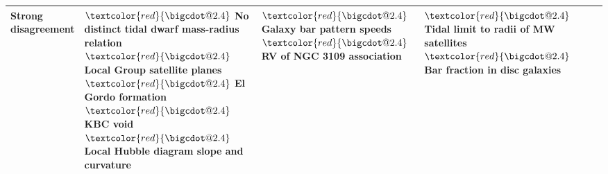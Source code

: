 \documentclass[fleqn,usenatbib,useAMS,onecolumn]{mnras} %
\makeatletter
\DeclareRobustCommand*\bigcdot{\mathpalette\bigcdot@{2.4}}
\DeclareRobustCommand*\bigcdot@[2]{\mathbin{\vcenter{\hbox{\scalebox{#2}{$\m@th#1\bullet$}}}}}
\makeatother
\begin{document}
\begin{table}
\begin{tabular}{llllll}
		\makecell{Strong \\ disagreement} & \makecell{$\textcolor{red}{\bigcdot}$ No distinct \\ tidal dwarf \\ mass-radius \\ relation \\ $\textcolor{red}{\bigcdot}$ Local Group \\ satellite planes \\ $\textcolor{red}{\bigcdot}$ El Gordo \\ formation \\ $\textcolor{red}{\bigcdot}$ KBC void \\ $\textcolor{red}{\bigcdot}$ Local Hubble \\ diagram slope \\ and curvature} & \makecell{$\textcolor{red}{\bigcdot}$ Galaxy bar \\ pattern speeds \\ $\textcolor{red}{\bigcdot}$ RV of NGC \\ 3109 association} & \makecell{$\textcolor{red}{\bigcdot}$ Tidal limit \\ to radii of \\ MW satellites \\ $\textcolor{red}{\bigcdot}$ Bar fraction \\ in disc galaxies} & \makecell{} & \makecell{} \\ \hline
	\end{tabular}
	\label{LCDM_overview}
\end{table}
\end{document}
